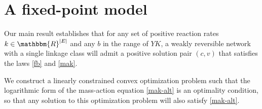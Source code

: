 \documentclass[smallextended]{svjour3}       %
\newcommand*{\0}{\mathbf{0}}
\newcommand*{\1}{\mathbf{1}}
\newcommand*{\R}{\mathbbm{R}}
\begin{document}
\section{A fixed-point model} 
\label{section:fp-model}

Our main result establishes that for any set of positive reaction rates
$k\in\R^{|E|}$ and any $b$ in the range of $YK$, a weakly reversible network with 
a single linkage class will admit a positive solution pair $(c,v)$ that satisfies the laws
\eqref{fb} and \eqref{mak}.  

We construct a linearly constrained convex optimization
problem such that the logarithmic form of the mass-action equation
\eqref{mak-alt} is an optimality condition, so that any solution to this
optimization problem will also satisfy \eqref{mak-alt}.
\end{document}
